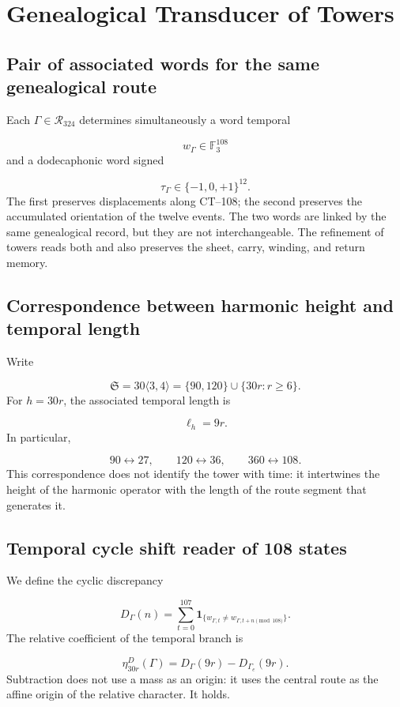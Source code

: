 \section{Genealogical Transducer of Towers}
\subsection{Pair of associated words for the same genealogical route}
Each \(\Gamma\in\mathcal R_{324}\) determines simultaneously a word temporal

\[
 w_\Gamma\in\mathbb F_3^{108}
\]
and a dodecaphonic word signed

\[
 \tau_\Gamma\in\{-1,0,+1\}^{12}.
\]
The first preserves displacements along CT--108; the second preserves the accumulated orientation of the twelve events. The two words are linked by the same genealogical record, but they are not interchangeable. The refinement of towers reads both and also preserves the sheet, carry, winding, and return memory.

\subsection{Correspondence between harmonic height and temporal length}
Write

\[
 \mathfrak S=30\langle3,4\rangle
 =\{90,120\}\cup\{30r:r\ge6\}.
\]
For \(h=30r\), the associated temporal length is

\[
 \ell_h=9r.
\]
In particular,

\[
 90\longleftrightarrow27,\qquad
 120\longleftrightarrow36,\qquad
 360\longleftrightarrow108.
\]
This correspondence does not identify the tower with time: it intertwines the height of the harmonic operator with the length of the route segment that generates it.

\subsection{Temporal cycle shift reader of 108 states}
We define the cyclic discrepancy

\[
 D_\Gamma(n)=
 \sum_{t=0}^{107}
 \mathbf1_{\{w_{\Gamma,t}\ne
 w_{\Gamma,t+n\!\!\!\pmod{108}}\}}.
\]
The relative coefficient of the temporal branch is

\[
 \boxed{\eta_{30r}^{D}(\Gamma)
 =D_\Gamma(9r)-D_{\Gamma_e}(9r).}
\]
Subtraction does not use a mass as an origin: it uses the central route as the affine origin of the relative character. It holds.

